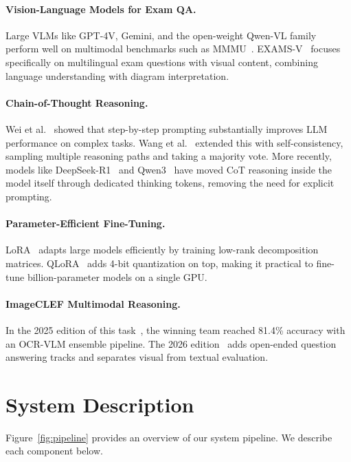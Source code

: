 \documentclass[]{ceurart}
\begin{document}
\paragraph{Vision-Language Models for Exam QA.}
Large VLMs like GPT-4V, Gemini, and the open-weight Qwen-VL family~\cite{qwen2.5vl} perform well on multimodal benchmarks such as MMMU~\cite{mmmu}.
EXAMS-V~\cite{examsv} focuses specifically on multilingual exam questions with visual content, combining language understanding with diagram interpretation.

\paragraph{Chain-of-Thought Reasoning.}
Wei et al.~\cite{cot} showed that step-by-step prompting substantially improves LLM performance on complex tasks.
Wang et al.~\cite{selfconsistency} extended this with self-consistency, sampling multiple reasoning paths and taking a majority vote.
More recently, models like DeepSeek-R1~\cite{deepseekr1} and Qwen3~\cite{qwen3} have moved CoT reasoning inside the model itself through dedicated thinking tokens, removing the need for explicit prompting.

\paragraph{Parameter-Efficient Fine-Tuning.}
LoRA~\cite{lora} adapts large models efficiently by training low-rank decomposition matrices.
QLoRA~\cite{qlora} adds 4-bit quantization on top, making it practical to fine-tune billion-parameter models on a single GPU.

\paragraph{ImageCLEF Multimodal Reasoning.}
In the 2025 edition of this task~\cite{imageclefmr2025}, the winning team reached 81.4\% accuracy with an OCR-VLM ensemble pipeline.
The 2026 edition~\cite{ImageCLEFMR2026} adds open-ended question answering tracks and separates visual from textual evaluation.


\section{System Description}
\label{sec:system}

Figure~\ref{fig:pipeline} provides an overview of our system pipeline.
We describe each component below.
\end{document}
